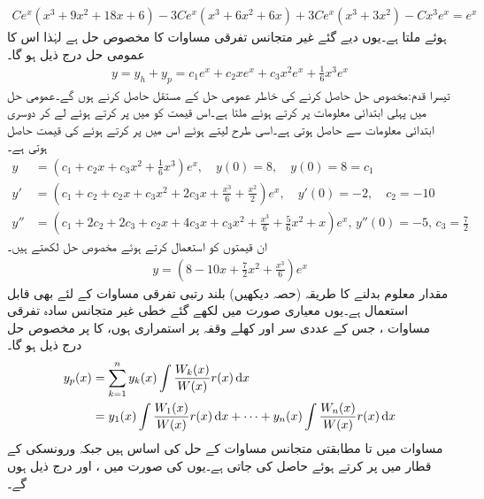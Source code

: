 \begin{align*}
Ce^x(x^3+9x^2+18x+6)-3Ce^x(x^3+6x^2+6x)+3Ce^x(x^3+3x^2)-Cx^3e^x=e^{x}
\end{align*}
ہوئے  ملتا ہے۔یوں دیے گئے غیر متجانس تفرقی مساوات کا مخصوص حل  ہے لہٰذا اس کا عمومی حل درج ذیل ہو گا۔
\begin{align*}
y=y_h+y_p=c_1e^x+c_2xe^x+c_3x^2e^x+\frac{1}{6}x^3e^x
\end{align*}
تیسرا قدم:\quad مخصوص حل حاصل کرنے کی خاطر عمومی حل کے مستقل حاصل کرنے ہوں گے۔عمومی حل میں پہلی ابتدائی معلومات  پر کرتے ہوئے  ملتا ہے۔اس قیمت کو  میں پر کرتے ہوئے  لے کر دوسری ابتدائی معلومات  سے  حاصل ہوتی ہے۔اسی طرح  لیتے ہوئے اس میں  پر کرتے ہوئے  کی قیمت حاصل ہوتی ہے۔
\begin{align*}
y&=(c_1+c_2x+c_3x^2+\frac{1}{6}x^3)e^x, \quad y(0)=8, \quad y(0)=8=c_1\\
y'&=(c_1+c_2+c_2x+c_3x^2+2c_3x+\frac{x^3}{6}+\frac{x^2}{2})e^x, \quad y'(0)=-2, \quad c_2=-10\\
y''&=(c_1+2c_2+2c_3+c_2x+4c_3x+c_3x^2+\frac{x^3}{6}+\frac{5}{6}x^2+x)e^x,\,y''(0)=-5, \, c_3=\frac{7}{2}
\end{align*} 
ان قیمتوں کو استعمال کرتے ہوئے مخصوص حل لکھتے ہیں۔
\begin{align*}
y=\left(8-10x+\frac{7}{2}x^2+\frac{x^3}{6}\right)e^x
\end{align*}
مقدار معلوم بدلنے کا طریقہ (حصہ  دیکھیں) بلند رتبی تفرقی مساوات  کے لئے بھی قابل استعمال ہے۔یوں معیاری صورت میں لکھے گئے خطی غیر متجانس سادہ تفرقی مساوات  ، جس کے عددی سر اور  کھلے وقفہ  پر استمراری ہوں، کا   پر مخصوص حل  درج ذیل ہو گا۔
\begin{gather}
\begin{aligned}\label{مساوات_سادہ_بلند_متعین_متغیرات_بدلنے_الف}
y_p(x)&=\sum_{k=1}^{n} y_k(x)\int \frac{W_k(x)}{W(x)} r(x)\dif x\\
&=y_1(x)\int \frac{W_1(x)}{W(x)}r(x)\dif x+\cdots+y_n(x)\int \frac{W_n(x)}{W(x)}r(x)\dif x
\end{aligned}
\end{gather}
مساوات  میں  تا  مطابقتی متجانس مساوات  کے حل کی اساس ہیں جبکہ ورونسکی  کے  قطار میں  پر کرتے ہوئے  حاصل کی جاتی ہے۔یوں  کی صورت میں ،  اور  درج ذیل ہوں گے۔
